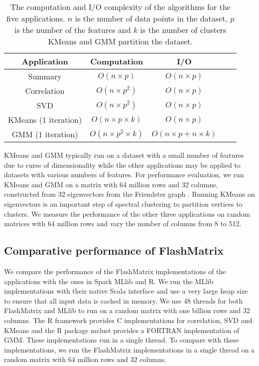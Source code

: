 \begin{table}
\begin{center}
\footnotesize
\begin{tabular}{|c|c|c|c|c|}
\hline
Application & Computation & I/O \\
\hline
Summary & $O(n \times p)$ & $O(n \times p)$ \\
\hline
Correlation & $O(n \times p^2)$ & $O(n \times p)$ \\
\hline
SVD & $O(n \times p^2)$ & $O(n \times p)$ \\
\hline
KMeans (1 iteration) & $O(n \times p \times k)$ & $O(n \times p)$ \\
\hline
GMM (1 iteration) & $O(n \times p^2 \times k)$ & $O(n \times p + n \times k)$ \\
\hline
\end{tabular}
\normalsize
\end{center}
\caption{The computation and I/O complexity of the algorithms for the five
	applications. $n$ is the number of data points in the dataset, $p$ is
	the number of the features and $k$ is the number of clusters KMeans and
GMM partition the dataset.}
\label{tbl:algs}
\end{table}

KMeans and GMM typically run on a dataset with a small number of features
due to curse of dimensionality \cite{} while the other applications may
be applied to datasets with various numbers
of features. For performance evaluation, we run KMeans and GMM on a matrix
with 64 million rows and 32 columns, constructed from 32 eigenvectors from
the Friendster graph \cite{friendster}. Running KMeans on eigenvectors is
an important step of spectral clustering \cite{Luxburg07} to partition vertices
to clusters. We measure the performance of the other three applications on
random matrices with 64 million rows and vary the number of columns from 8
to 512.

\subsection{Comparative performance of FlashMatrix}

We compare the performance of the FlashMatrix implementations of the applications
with the ones in Spark MLlib \cite{mllib} and R. We run the MLlib implementations
with their native Scala interface and use a very large heap size to ensure that
all input data is cached in memory. We use 48 threads for both FlashMatrix and
MLlib to run on a random matrix with one billion rows and 32 columns.
The R framework provides C implementations for correlation, SVD and KMeans and
the R package mclust \cite{mclust} provides a FORTRAN implementation of GMM.
These implementations run in a single thread. To compare with these implementations,
we run the FlashMatrix implementations in a single thread on a random matrix
with 64 million rows and 32 columns.

